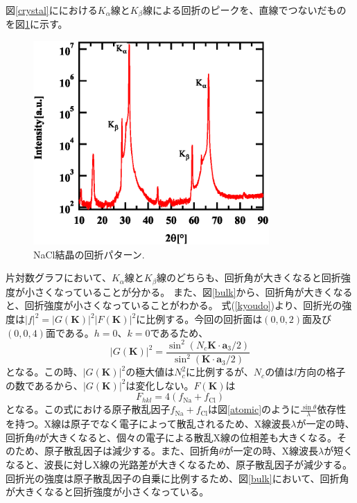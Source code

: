 \documentclass[11pt,a4j,uplatex]{jsarticle}
\begin{document}
図\ref{crystal}ににおける$K_\alpha$線と$K_\beta$線による回折のピークを、直線でつないだものを図\ref{kakb}に示す。

 \begin{figure}[htb]
  \centering
  \includegraphics[clip,width=9cm]{kakb.eps}
  \caption{NaCl結晶の回折パターン.}
  \label{kakb}
 \end{figure}

片対数グラフにおいて、$K_\alpha$線と$K_\beta$線のどちらも、回折角が大きくなると回折強度が小さくなっていることが分かる。
\fi
また、図\ref{bulk}から、回折角が大きくなると、回折強度が小さくなっていることがわかる。
式(\ref{kyoudo})より、回折光の強度は${|f|}^2={|G\bm{(K)}|^2}{|F\bm{(K)}|^2}$に比例する。今回の回折面は$(0,0,2)$面及び$(0,0,4)$面である。$h=0、k=0$であるため、
\begin{equation}
  |G(\bm{K})|^2=\frac{\sin^2(N_c\bm{K}\cdot\bm{a}_3/2)}{\sin^2(\bm{K}\cdot\bm{a}_3/2)}
\end{equation}
となる。この時、$|G(\bm{K})|^2$の極大値は$N_c^2$に比例するが、$N_c$の値は$l$方向の格子の数であるから、$|G(\bm{K})|^2$は変化しない。$F(\bm{K})$は
\begin{equation}
  F_{hkl}=4(f_{\mathrm{Na}}+f_{\mathrm{Cl}})
\end{equation}
となる。この式における原子散乱因子$f_{\mathrm{Na}}+f_{\mathrm{Cl}}$は図\ref{atomic}のように$\frac{\sin\theta}{\lambda}$依存性を持つ\cite{atom}。X線は原子でなく電子によって散乱されるため、X線波長$\lambda$が一定の時、回折角$\theta$が大きくなると、個々の電子による散乱X線の位相差も大きくなる。そのため、原子散乱因子は減少する。また、回折角$\theta$が一定の時、X線波長$\lambda$が短くなると、波長に対しX線の光路差が大きくなるため、原子散乱因子が減少する。回折光の強度は原子散乱因子の自乗に比例するため、図\ref{bulk}において、回折角が大きくなると回折強度が小さくなっている。
\end{document}
